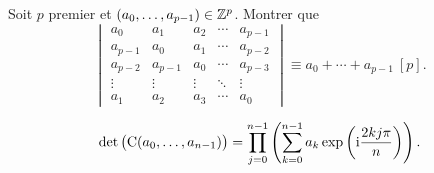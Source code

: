 \begin{exercice}
    Soit $p$ premier et $(a_0, \dots, a_{p-1}) \in \mathbb{Z}^p$. Montrer que
    $$
    \begin{vmatrix}
        a_0 & a_1 & a_2 & \cdots & a_{p-1} \\
        a_{p-1} & a_0 & a_1 & \cdots & a_{p-2} \\
        a_{p-2} & a_{p-1} & a_0 & \cdots & a_{p-3} \\
        \vdots & \vdots & \vdots & \ddots & \vdots \\
        a_1 & a_2 & a_3 & \cdots & a_0
    \end{vmatrix}
    \equiv a_0 + \cdots + a_{p-1}\ [p].
    $$
\end{exercice}

\begin{solution}
    $$\det \big( \mathrm{C}(a_0, \dots, a_{n-1}) \big) = \prod_{j=0}^{n-1} \left( \sum_{k=0}^{n-1} a_k \exp \left( \mathrm{i} \frac{2kj \pi}{n} \right) \right).$$
\end{solution}